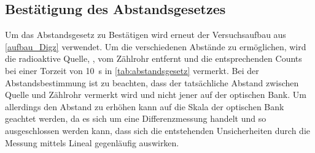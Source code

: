\documentclass[12pt,english,ngerman]{scrartcl}
\begin{document}
\begin{table}[H]
	\caption[Erhaltene Counts für die Zählstatistik]{
		Tabelle in der, der Besseren Übersicht
		halber, ein Ausschnitt der erhaltenen Counts für die Zählstatistik für eine
		Torzeit von \SI{1}{\second} aufgelistet sind. Dabei sind die Counts sind exakt. \\
		\(t \dots\) entsprechende Zeit, die den Memory Speicher übergeben wird,
		in s, dabei werden die Werte der besseren Lesbarkeit halber nur auf eine
		Nachkommastelle genau angegeben. Dennoch sei hier zu bemerken, dass die
		Unsicherheit im Nanosekunden-Bereich liegt und in der Auswertung berücksichtigt
		worden ist.                                                                     \\
		\(n \dots\) verzeichnete Anzahl an Counts
	}\label{tab:zahlstatistik}
	\begin{center}
		
	\end{center}
\end{table}

\subsection{Bestätigung des Abstandsgesetzes}

Um das Abstandsgesetz zu Bestätigen wird erneut der Versuchsaufbau aus
\autoref{aufbau_Digz} verwendet. Um die verschiedenen Abstände zu ermöglichen,
wird die radioaktive Quelle, , vom Zählrohr entfernt und die
entsprechenden Counts bei einer Torzeit von \SI{10}{\second} in
\autoref{tab:abstandsgesetz} vermerkt. Bei der Abstandsbestimmung ist zu
beachten, dass der tatsächliche Abstand zwischen Quelle und Zählrohr vermerkt
wird und nicht jener auf der optischen Bank. Um allerdings den Abstand zu
erhöhen kann auf die Skala der optischen Bank geachtet werden, da es sich um
eine Differenzmessung handelt und so ausgeschlossen werden kann, dass sich die
entstehenden Unsicherheiten durch die Messung mittels Lineal gegenläufig
auswirken.

\begin{table}[H]
	\caption[Erhaltene Zählraten bei unterschiedlichen Abständen der Quelle]{
		Erhaltene
		Zählraten bei unterschiedlichen Abständen der Quelle bei einer Torzeit von
		\SI{10}{\second}. Dabei sind die Zählraten exakt                                                                     \\
		\(l_{\mathrm{Quelle}} \dots\) Abstand der radioaktiven Quelle in cm mit einer Unsicherheit von \SI{0.2}{\cm} \\
		\(z_{i} \dots\) erhaltene Zählrate bei entsprechendem Abstand
	} \label{tab:abstandsgesetz}
	\begin{center}
		
	\end{center}
\end{table}
\end{document}
